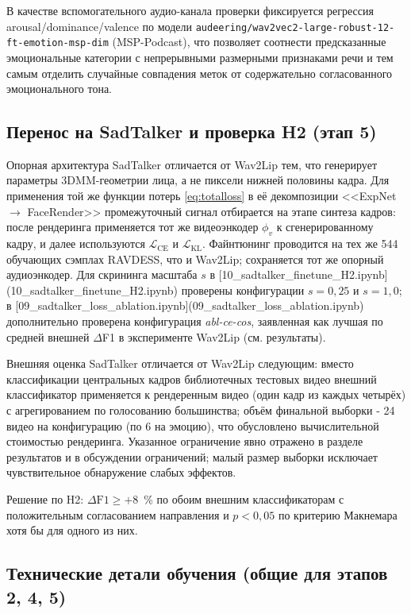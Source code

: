 \documentclass[a4paper, 12pt, oneside, openany]{article}
\begin{document}
В качестве вспомогательного аудио-канала проверки фиксируется регрессия arousal/dominance/valence по модели \texttt{audeering/wav2vec2-large-robust-12-ft-emotion-msp-dim} (MSP-Podcast), что позволяет соотнести предсказанные эмоциональные категории с непрерывными размерными признаками речи и тем самым отделить случайные совпадения меток от содержательно согласованного эмоционального тона.

\subsection{Перенос на SadTalker и проверка H2 (этап 5)}

Опорная архитектура SadTalker \cite{zhang2023sadtalker} отличается от Wav2Lip тем, что генерирует параметры 3DMM-геометрии лица, а не пиксели нижней половины кадра. Для применения той же функции потерь \eqref{eq:totalloss} в её декомпозиции <<ExpNet $\to$ FaceRender>> промежуточный сигнал отбирается на этапе синтеза кадров: после рендеринга применяется тот же видеоэнкодер $\phi_v$ к сгенерированному кадру, и далее используются $\mathcal{L}_{\text{CE}}$ и $\mathcal{L}_{\text{KL}}$. Файнтюнинг проводится на тех же 544 обучающих сэмплах RAVDESS, что и Wav2Lip; сохраняется тот же опорный аудиоэнкодер. Для скрининга масштаба $s$ в [10\_sadtalker\_finetune\_H2.ipynb](10\_sadtalker\_finetune\_H2.ipynb) проверены конфигурации $s=0{,}25$ и $s=1{,}0$; в [09\_sadtalker\_loss\_ablation.ipynb](09\_sadtalker\_loss\_ablation.ipynb) дополнительно проверена конфигурация \textit{abl-ce-cos}, заявленная как лучшая по средней внешней $\Delta$F1 в эксперименте Wav2Lip (см. результаты).

Внешняя оценка SadTalker отличается от Wav2Lip следующим: вместо классификации центральных кадров библиотечных тестовых видео внешний классификатор применяется к рендеренным видео (один кадр из каждых четырёх) с агрегированием по голосованию большинства; объём финальной выборки - 24 видео на конфигурацию (по 6 на эмоцию), что обусловлено вычислительной стоимостью рендеринга. Указанное ограничение явно отражено в разделе результатов и в обсуждении ограничений; малый размер выборки исключает чувствительное обнаружение слабых эффектов.

Решение по H2: $\Delta\text{F1} \geq +8$~\% по обоим внешним классификаторам с положительным согласованием направления и $p < 0{,}05$ по критерию Макнемара хотя бы для одного из них.

\subsection{Технические детали обучения (общие для этапов 2, 4, 5)}
\end{document}
